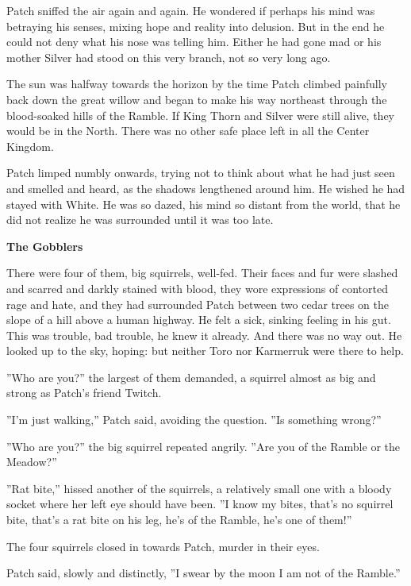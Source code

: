 \documentclass[11pt]{article}
\begin{document}
 Patch sniffed the air again and again. He wondered if perhaps his mind was betraying his senses, mixing hope and reality into delusion. But in the end he could not deny what his nose was telling him. Either he had gone mad %
 or his mother Silver had stood on this very branch, not so very long ago.\par
 The sun was halfway towards the horizon by the time Patch climbed painfully back down the great willow and began to make his way northeast through the blood-soaked hills of the Ramble. If King Thorn and Silver were still alive, they would be in the North. There was no other safe place left in all the Center Kingdom.\par
 Patch limped numbly onwards, trying not to think about what he had just seen and smelled and heard, as the shadows lengthened around him. He wished he had stayed with White. He was so dazed, his mind so distant from the world, that he did not realize he was surrounded until it was too late.\par
\par
{\bf The Gobblers\par
}\par
 There were four of them, big squirrels, well-fed. Their faces and fur were slashed and scarred and darkly stained with blood, they wore expressions of contorted rage and hate, and they had surrounded Patch between two cedar trees on the slope of a hill above a human highway. He felt a sick, sinking feeling in his gut. This was trouble, bad trouble, he knew it already. And there was no way out. He looked up to the sky, hoping: but neither Toro nor Karmerruk were there to help.\par
 ''Who are you?'' the largest of them demanded, a squirrel almost as big and strong as Patch's friend Twitch.\par
 ''I'm just walking,'' Patch said, avoiding the question. ''Is something wrong?''\par
 ''Who are you?'' the big squirrel repeated angrily. ''Are you of the Ramble or the Meadow?''\par
 ''Rat bite,'' hissed another of the squirrels, a relatively small one with a bloody socket where her left eye should have been. ''I know my bites, that's no squirrel bite, that's a rat bite on his leg, he's of the Ramble, he's one of them!''\par
 The four squirrels closed in towards Patch, murder in their eyes.\par
 Patch said, slowly and distinctly, ''I swear by the moon I am not of the Ramble.''\par
\end{document}
